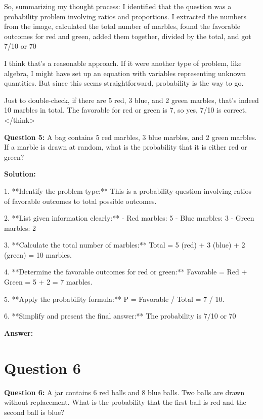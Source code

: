 \documentclass[12pt]{article}
\begin{document}
So, summarizing my thought process: I identified that the question was a probability problem involving ratios and proportions. I extracted the numbers from the image, calculated the total number of marbles, found the favorable outcomes for red and green, added them together, divided by the total, and got 7/10 or 70%

I think that's a reasonable approach. If it were another type of problem, like algebra, I might have set up an equation with variables representing unknown quantities. But since this seems straightforward, probability is the way to go.

Just to double-check, if there are 5 red, 3 blue, and 2 green marbles, that's indeed 10 marbles in total. The favorable for red or green is 7, so yes, 7/10 is correct.
</think>

\textbf{Question 5:} A bag contains 5 red marbles, 3 blue marbles, and 2 green marbles. If a marble is drawn at random, what is the probability that it is either red or green?

\textbf{Solution:}

1. **Identify the problem type:** This is a probability question involving ratios of favorable outcomes to total possible outcomes.

2. **List given information clearly:** 
   - Red marbles: 5
   - Blue marbles: 3
   - Green marbles: 2

3. **Calculate the total number of marbles:**
   Total = 5 (red) + 3 (blue) + 2 (green) = 10 marbles.

4. **Determine the favorable outcomes for red or green:**
   Favorable = Red + Green = 5 + 2 = 7 marbles.

5. **Apply the probability formula:**
   P = Favorable / Total = 7 / 10.

6. **Simplify and present the final answer:**
   The probability is 7/10 or 70%

\textbf{Answer:} 
\newpage

\section{Question 6}

\textbf{Question 6:} A jar contains 6 red balls and 8 blue balls. Two balls are drawn without replacement. What is the probability that the first ball is red and the second ball is blue?
\end{document}
